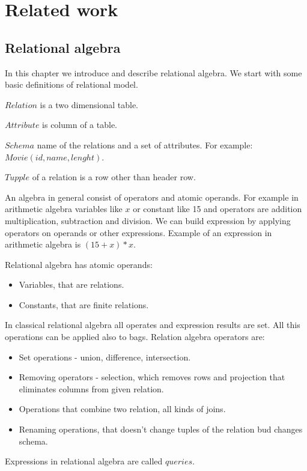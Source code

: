 \chapter{Related work}

\section{Relational algebra}

In this chapter we introduce and describe relational algebra\cite{database}. We start with some basic definitions of relational model.

\begin{mydef}
$Relation$ is a two dimensional table.
\end{mydef}
\begin{mydef}
$Attribute$ is column of a table.
\end{mydef}
\begin{mydef}
$Schema$ name of the relations and a set of attributes. For example:~$Movie(id,name,lenght)$.
\end{mydef}
\begin{mydef}
$Tupple$ of a relation is a row other than header row.
\end{mydef}


An algebra in general consist of  operators and atomic operands. For example in arithmetic algebra variables like $x$ or constant like 15 and operators are addition multiplication, subtraction and division.
We can build expression by applying operators on operands or other expressions. Example of an expression in arithmetic algebra is $(15+x)*x$.

Relational algebra  has atomic operands:
\begin{itemize}
\item Variables, that are relations.
\item Constants, that are finite relations. 
\end{itemize}

In classical relational algebra all operates and expression results are set. All this operations can be applied also to bags.
Relation algebra operators are:
\begin{itemize}
\item Set operations - union, difference, intersection.
\item Removing operators - selection, which removes rows and projection that eliminates columns from given relation.
\item Operations that combine two relation, all kinds of joins.
\item Renaming operations, that doesn't change tuples of the relation bud changes schema.
\end{itemize}
Expressions in relational algebra are called $queries$.

